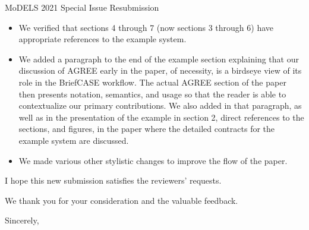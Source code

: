 \documentclass[10pt]{byu-cs}
\begin{document}
\begin{letter}{MoDELS 2021 Special Issue Resubmission}
\begin{itemize}
  \item We verified that sections 4 through 7 (now sections 3 through 6) have appropriate references to the example system.
  \item We added a paragraph to the end of the example section explaining that our discussion of AGREE early in the paper, of necessity, is a birdseye view of its role in the BriefCASE workflow. The actual AGREE section of the paper then presents notation, semantics, and usage so that the reader is able to contextualize our primary contributions. We also added in that paragraph, as well as in the presentation of the example in section 2, direct references to the sections, and figures, in the paper where the detailed contracts for the example system are discussed. 
  \item We made various other stylistic changes to improve the flow of the paper.
\end{itemize}

I hope this new submission satisfies the reviewers' requests.

We thank you for your consideration and the valuable feedback.

\closing{Sincerely,}

\end{letter}
\end{document}

